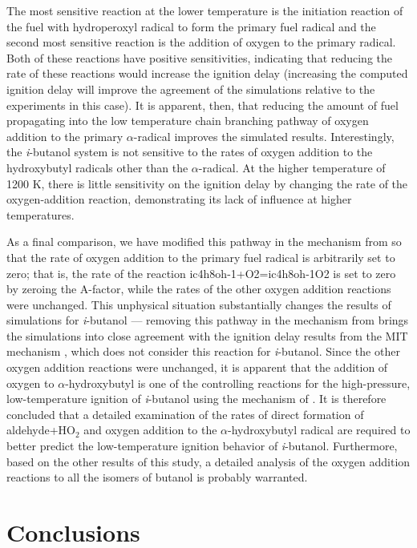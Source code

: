 \documentclass[12pt, letterpaper]{article}
\begin{document}
The most sensitive reaction at the lower temperature is the initiation reaction
of the fuel with hydroperoxyl radical to form the primary fuel radical and the
second most sensitive reaction is the addition of oxygen to the primary
radical. Both of these reactions have positive sensitivities, indicating that
reducing the rate of these reactions would increase the ignition delay
(increasing the computed ignition delay will improve the agreement of the
simulations relative to the experiments in this case). It is apparent, then,
that reducing the amount of fuel propagating into the low temperature chain
branching pathway of oxygen addition to the primary $\alpha$-radical improves
the simulated results. Interestingly, the \textit{i}-butanol system is not
sensitive to the rates of oxygen addition to the hydroxybutyl radicals other
than the $\alpha$-radical. At the higher temperature of 1200 K, there is little
sensitivity on the ignition delay by changing the rate of the oxygen-addition
reaction, demonstrating its lack of influence at higher temperatures.

As a final comparison, we have modified this pathway in the mechanism from
\textcite{Sarathy2012} so that the rate of oxygen addition to the primary
fuel radical is arbitrarily set to zero; that is, the rate of the reaction
ic4h8oh-1+O2=ic4h8oh-1O2 is set to zero by zeroing the A-factor, while the
rates of the other oxygen addition reactions were unchanged. This unphysical
situation substantially changes the results of simulations for
\textit{i}-butanol --- removing this pathway in the mechanism from
\textcite{Sarathy2012} brings the simulations into close agreement with the
ignition delay results from the MIT mechanism \cite{Hansen2013,Merchant2013},
which does not consider this reaction for \textit{i}-butanol. Since the other
oxygen addition reactions were unchanged, it is apparent that the addition of
oxygen to $\alpha$-hydroxybutyl is one of the controlling reactions for the
high-pressure, low-temperature ignition of \textit{i}-butanol using the
mechanism of \textcite{Sarathy2012}. It is therefore concluded that a detailed
examination of the rates of direct formation of aldehyde+HO$_2$ and oxygen
addition to the $\alpha$-hydroxybutyl radical are required to better predict
the low-temperature ignition behavior of \textit{i}-butanol. Furthermore, based
on the other results of this study, a detailed analysis of the oxygen addition
reactions to all the isomers of butanol is probably warranted.

\section{Conclusions}
\label{sec:buoh-conclusions}
\end{document}
